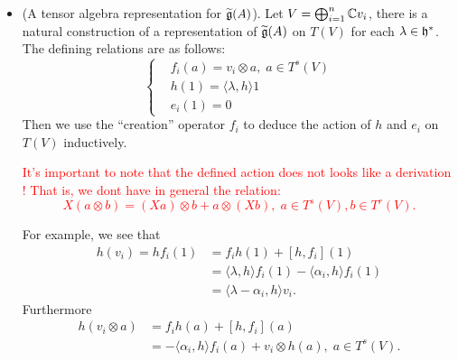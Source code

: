\begin{itemize}
\begin{equation}
\begin{aligned}
        \end{aligned}\right.
    \end{equation}
    for all $h\in\fr{h}$. Call all these relations by $R$, we will write 
    \begin{equation}
        \widetilde{\fr{g}}(A) = \frac{FL(X)}{R}.
    \end{equation}
    \item(A tensor algebra representation for $\widetilde{\mathfrak{g}}(A)$). Let $V=\bigoplus_{i=1}^n\mathbb{C} v_i$, there is a 
    natural construction of a representation of $\widetilde{\mathfrak{g}}(A)$ on $T(V)$ for each $\lambda\in\mathfrak{h}^*$. 
    The defining relations are as follows:
    \begin{equation}
        \left\{\begin{aligned}
            &f_i(a) = v_i\otimes a,\; a\in T^s(V)\\
            &h(1) = \langle\lambda,h\rangle 1\\
            &e_i(1) = 0
        \end{aligned}\right.
    \end{equation}
    Then we use the ``creation'' operator $f_i$ to deduce the action of $h$ and $e_i$ on $T(V)$ inductively.
    \begin{center}
        \textcolor{red}{It's important to note that the defined action does not looks like a derivation ! 
        That is, we dont have in general the 
        relation:
        \begin{equation}
            X (a\otimes b) = (Xa)\otimes b + a\otimes(Xb),\;a\in T^s(V),b\in T^r(V).
        \end{equation}}
    \end{center}
    For example, we see that 
    \begin{equation}
        \begin{split}
            h(v_i) = hf_i(1) &= f_ih(1) + [h,f_i](1)\\
            &= \langle \lambda, h\rangle f_i(1) - \langle \alpha_i, h\rangle f_i(1)\\
            & = \langle \lambda - \alpha_i, h\rangle v_i. 
        \end{split} 
    \end{equation}
    Furthermore 
    \begin{equation}
        \begin{split}
            h(v_i\otimes a) &= f_ih(a) + [h,f_i](a)\\
            &=  - \langle \alpha_i, h\rangle f_i(a) + v_i\otimes h(a),\; a\in T^s(V).

\end{split}
\end{equation}
\end{itemize}
